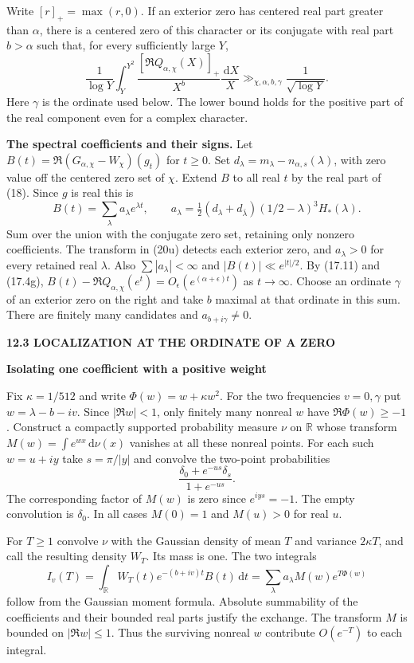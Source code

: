 \documentclass[11pt,letterpaper]{article}
\newcommand{\rightmarktext}{}
\newcommand{\printfolio}{}
\newcommand{\leaf}[4]{\clearpage\gdef\printfolio{#1}\gdef\rightmarktext{#2}%
  {\small\sffamily\bfseries\color{ink}#3\par}\vspace{3pt}%
  {\LARGE\bfseries #4\par}\vspace{5pt}}
\newcommand{\point}[1]{\par\smallskip\textbf{#1.}\enspace\ignorespaces}
\newcommand{\R}{\mathbb R}
\newcommand{\dd}{\,\mathrm d}
\begin{document}
Write $[r]_+=\max(r,0)$. If an exterior zero has centered real part
greater than $\alpha$, there is a centered zero of this character or
its conjugate with real part $b>\alpha$ such that, for every sufficiently
large $Y$,
\[
 \frac1{\log Y}\int_Y^{Y^2}
          \frac{[\Re Q_{\alpha,\chi}(X)]_+}{X^b}\frac{\dd X}{X}
              \gg_{\chi,\alpha,b,\gamma} \frac1{\sqrt{\log Y}} .
 \tag{17.4h}
\]
Here $\gamma$ is the ordinate used below. The lower bound holds for
the positive part of the real component even for a complex character.

\point{The spectral coefficients and their signs}
Let $B(t)=\Re(G_{\alpha,\chi}-W_\chi)(g_t)$ for $t\ge0$.
Set $d_\lambda=m_\lambda-n_{\alpha,s}(\lambda)$, with zero value
off the centered zero set of $\chi$. Extend $B$ to all real $t$ by
the real part of (18). Since $g$ is real this is
\[
 B(t)=\sum_\lambda a_\lambda e^{\lambda t},\qquad
 a_\lambda=\tfrac12(d_\lambda+d_{\bar\lambda})
                    (1/2-\lambda)^3 H_*(\lambda).
\]
Sum over the union with the conjugate zero set, retaining only
nonzero coefficients. The transform in (20u) detects each exterior
zero, and $a_\lambda>0$ for every retained real $\lambda$.
Also $\sum |a_\lambda|<\infty$ and $|B(t)|\ll e^{|t|/2}$.
By (17.11) and (17.4g),
$B(t)-\Re Q_{\alpha,\chi}(e^t)=O_\epsilon(e^{(\alpha+\epsilon)t})$
as $t\to\infty$. Choose an ordinate $\gamma$ of an exterior zero
on the right and take $b$ maximal at that ordinate in this sum.
There are finitely many candidates and $a_{b+i\gamma}\ne0$.

\leaf{514m}{A positive averaging measure}{12.3 \quad LOCALIZATION AT THE ORDINATE OF A ZERO}{Isolating one coefficient with a positive weight}
Fix $\kappa=1/512$ and write $\Phi(w)=w+\kappa w^2$. For the two
frequencies $v=0,\gamma$ put $w=\lambda-b-iv$. Since $|\Re w|<1$,
only finitely many nonreal $w$ have $\Re\Phi(w)\ge-1$.
Construct a compactly supported probability measure $\nu$ on $\R$
whose transform $M(w)=\int e^{wx}\dd\nu(x)$ vanishes at all these
nonreal points. For each such $w=u+iy$ take $s=\pi/|y|$ and
convolve the two-point probabilities
\[
                  \frac{\delta_0+e^{-us}\delta_s}{1+e^{-us}}.
\]
The corresponding factor of $M(w)$ is zero since $e^{iys}=-1$.
The empty convolution is $\delta_0$. In all cases $M(0)=1$ and
$M(u)>0$ for real $u$.

For $T\ge1$ convolve $\nu$ with the Gaussian density of mean $T$
and variance $2\kappa T$, and call the resulting density $W_T$.
Its mass is one. The two integrals
\[
 I_v(T)=\int_{\R} W_T(t)e^{-(b+iv)t}B(t)\dd t
       =\sum_\lambda a_\lambda M(w)e^{T\Phi(w)}
\]
follow from the Gaussian moment formula. Absolute summability of
the coefficients and their bounded real parts justify the exchange.
The transform $M$ is bounded on $|\Re w|\le1$. Thus the surviving
nonreal $w$ contribute $O(e^{-T})$ to each integral.
\end{document}
